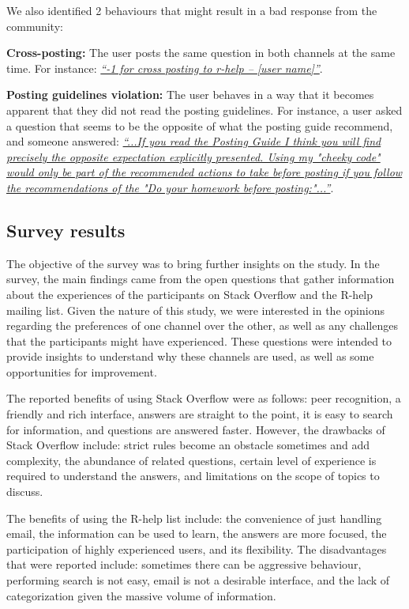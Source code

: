     We also identified 2 behaviours that might result in a bad response from the community:
    \begin{packed_enum}
        \item \textbf{Cross-posting:} The user posts the same question in both channels at the same time.
        For instance: \textit{\href{http://goo.gl/ENKrVK}{``-1 for cross posting to r-help – [user name]''}}.
        \item \textbf{Posting guidelines violation:} The user behaves in a way that it becomes apparent that they did not read the posting guidelines.
        For instance, a user asked a question that seems to be the opposite of what the posting guide recommend, and someone answered: \textit{\href{http://goo.gl/FUm1HC}{``...If you read the Posting Guide I think you will find precisely the opposite expectation explicitly presented. Using my "cheeky code" would only be part of the recommended actions to take before posting if you follow the recommendations of the "Do your homework before posting:"...''}}.
    \end{packed_enum}

\subsection{Survey results}
\label{sec:survey}

    The objective of the survey was to bring further insights on the study.
    In the survey, the main findings came from the open questions that gather information about the experiences of the participants on Stack Overflow and the R-help mailing list.
    Given the nature of this study, we were interested in the opinions regarding the preferences of one channel over the other, as well as any challenges that the participants might have experienced.
    These questions were intended to provide insights to understand why these channels are used, as well as some opportunities for improvement.

    The reported benefits of using Stack Overflow were as follows: peer recognition, a friendly and rich interface, answers are straight to the point, it is easy to search for information, and questions are answered faster.
    However, the drawbacks of Stack Overflow include: strict rules become an obstacle sometimes and add complexity, the abundance of related questions, certain level of experience is required to understand the answers, and limitations on the scope of topics to discuss.

    The benefits of using the R-help list include: the convenience of just handling email, the information can be used to learn, the answers are more focused, the participation of highly experienced users, and its flexibility.
    The disadvantages that were reported include: sometimes there can be aggressive behaviour, performing search is not easy, email is not a desirable interface, and the lack of categorization given the massive volume of information.


